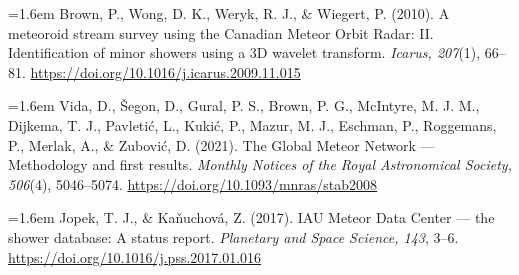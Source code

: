 \documentclass[11pt]{article}
\begin{document}
\medskip
{\setlength{\parindent}{0pt}%
\hangindent=1.6em
Brown, P., Wong, D. K., Weryk, R. J., \& Wiegert, P. (2010). A meteoroid stream
survey using the Canadian Meteor Orbit Radar: II. Identification of minor showers
using a 3D wavelet transform. \textit{Icarus, 207}(1), 66--81.
\url{https://doi.org/10.1016/j.icarus.2009.11.015}\par
\smallskip
\hangindent=1.6em
Vida, D., \v{S}egon, D., Gural, P. S., Brown, P. G., McIntyre, M. J. M., Dijkema,
T. J., Pavleti\'c, L., Kuki\'c, P., Mazur, M. J., Eschman, P., Roggemans, P.,
Merlak, A., \& Zubovi\'c, D. (2021). The Global Meteor Network --- Methodology and
first results. \textit{Monthly Notices of the Royal Astronomical Society,
506}(4), 5046--5074. \url{https://doi.org/10.1093/mnras/stab2008}\par
\smallskip
\hangindent=1.6em
Jopek, T. J., \& Ka\v{n}uchov\'a, Z. (2017). IAU Meteor Data Center --- the shower
database: A status report. \textit{Planetary and Space Science, 143}, 3--6.
\url{https://doi.org/10.1016/j.pss.2017.01.016}\par
}
\end{document}
